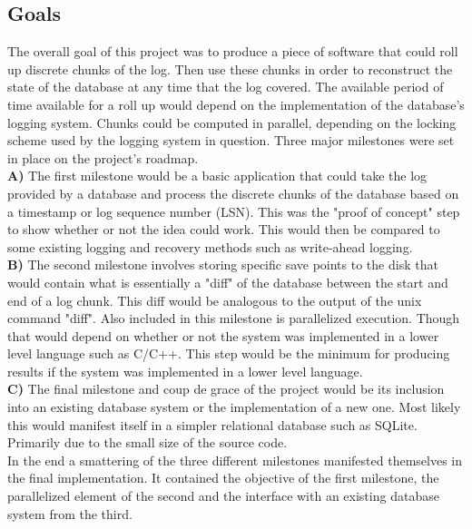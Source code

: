 \documentclass{article}
\begin{document}
\subsection{Goals}
The overall goal of this project was to produce a piece of software that could roll up discrete chunks
of the log. Then use these chunks in order to reconstruct the state of the database at any time that
the log covered. The available period of time available for a roll up would depend on the implementation
of the database's logging system. Chunks could be computed in parallel, depending on the locking scheme
used by the logging system in question. Three major milestones were set in place on the project's roadmap.\\

\textbf{A)} The first milestone would be a basic application that could take the log provided by a database
and process the discrete chunks of the database based on a timestamp or log sequence number (LSN). This was 
the "proof of concept" step to show whether or not the idea could work. This would then be compared to some
existing logging and recovery methods such as write-ahead logging.\\

\textbf{B)} The second milestone involves storing specific save points to the disk that would contain what 
is essentially a "diff" of the database between the start and end of a log chunk. This diff would be 
analogous to the output of the unix command "diff". Also included in this milestone is parallelized execution.
Though that would depend on whether or not the system was implemented in a lower level language such as C/C++. This step would be the minimum for producing results if the system was implemented in a lower level language.\\

\textbf{C)} The final milestone and coup de grace of the project would be its inclusion into an existing
database system or the implementation of a new one. Most likely this would manifest itself in a simpler
relational database such as SQLite. Primarily due to the small size of the source code.\\

In the end a smattering of the three different milestones manifested themselves in the final implementation. It contained the objective of the first milestone, the parallelized element of the second and the interface with an existing database system from the third.\\
\end{document}
